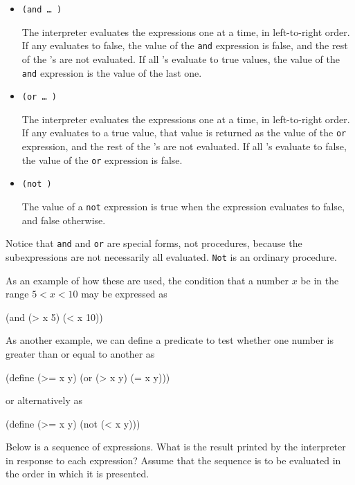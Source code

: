 \begin{schemedisplay}
\begin{itemize}
\item \texttt{(and  \ldots{} )}

The interpreter evaluates the expressions  one at a time, in
left-to-right order.  If any  evaluates to false, the value of
the \texttt{and} expression is false, and the rest of the 's
are not evaluated.  If all 's evaluate to true values, the
value of the \texttt{and} expression is the value of the last one.

\item \texttt{(or  \ldots{} )}

The interpreter evaluates the expressions  one at a time, in
left-to-right order.  If any  evaluates to a true value, that
value is returned as the value of the \texttt{or} expression, and the
rest of the 's are not evaluated.  If all 's evaluate
to false, the value of the \texttt{or} expression is false.

\item \texttt{(not )}

The value of a \texttt{not} expression is true
when the expression  evaluates to false, and false otherwise.
\end{itemize}

Notice that \texttt{and} and \texttt{or} are special forms, not
procedures, because the subexpressions are not necessarily all
evaluated.  \texttt{Not} is an ordinary procedure.

As an example of how these are used, the condition that a number
$x$ be in the range $5 < x < 10$ may be expressed as

\begin{schemedisplay}
(and (> x 5) (< x 10))
\end{schemedisplay}

As another example, we can define a predicate to test whether one
number is greater than or equal to another as

\begin{schemedisplay}
(define (>= x y)
  (or (> x y) (= x y)))
\end{schemedisplay}

\noindent or alternatively as

\begin{schemedisplay}
(define (>= x y)
  (not (< x y)))
\end{schemedisplay}

\begin{Exercise}
  \label{exc:1.1}
Below is a sequence of expressions.  What is the result printed by the
interpreter in response to each expression?  Assume that the sequence
is to be evaluated in the order in which it is presented.


\end{Exercise}
\end{schemedisplay}

